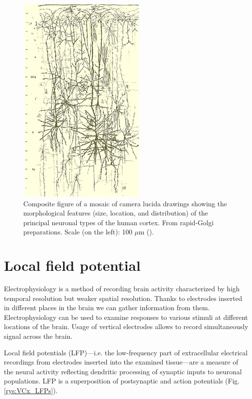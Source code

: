 \documentclass{pracalicmgr}
\begin{document}
   \begin{figure}[H]
   	\begin{center}
   		\includegraphics[scale=1]{morphology_neurons.png}
   	\end{center}
   	\caption{Composite figure of a mosaic of camera lucida drawings showing the morphological features (size, location, and distribution) of the principal neuronal types of the human cortex. From rapid-Golgi preparations. Scale (on the left): 100 $\mu$m  (\cite{morphology}).}
   	\label{rys:morphology_neurons}
   \end{figure}   
   
   
   \section{Local field potential}
   Electrophysiology is a method of recording brain activity characterized by high temporal resolution but weaker spatial resolution. Thanks to electrodes inserted in different places in the brain we can gather information from them. Electrophysiology can be used to examine responses to various stimuli at different locations of the brain. Usage of vertical electrodes allows to record simultaneously signal across the brain.
   
   Local field potentials (LFP)---i.e. the low-frequency part of extracellular electrical
   recordings from electrodes inserted into the examined tissue---are a measure of the neural activity reflecting dendritic processing of synaptic inputs to neuronal populations. LFP is a superposition of postsynaptic and action potentials  (Fig. \ref{rys:VCx_LFPs}).
   
\end{document}
